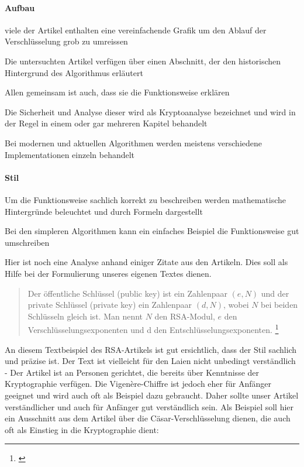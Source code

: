 \documentclass[11pt,paper=a4,final]{scrartcl}
\begin{document}
\paragraph{Aufbau}
\begin{itemize*}
  \item viele der Artikel enthalten eine vereinfachende Grafik um den Ablauf der
  Verschl\"usselung grob zu umreissen
  \item Die untersuchten Artikel verf\"ugen \"uber einen Abschnitt, der den
  historischen Hintergrund des Algorithmus erl\"autert
  \item Allen gemeinsam ist auch, dass sie die Funktionsweise erkl\"aren
  \item Die Sicherheit und Analyse dieser wird als Kryptoanalyse bezeichnet und
  wird in der Regel in einem oder gar mehreren Kapitel behandelt
  \item Bei modernen und aktuellen Algorithmen werden meistens verschiedene
  Implementationen einzeln behandelt
\end{itemize*}
\paragraph{Stil}
\begin{itemize*}
  \item Um die Funktionsweise sachlich korrekt zu beschreiben werden
  mathematische Hintergr\"unde beleuchtet und durch Formeln dargestellt
  \item Bei den simpleren Algorithmen kann ein einfaches Beispiel die
  Funktionsweise gut umschreiben
\end{itemize*}

Hier ist noch eine Analyse anhand einiger Zitate aus den Artikeln. Dies soll als
Hilfe bei der Formulierung unseres eigenen Textes dienen.

\begin{quote}
  \frqq Der öffentliche Schlüssel (public key) ist ein Zahlenpaar \((e,N)\) und
  der private Schlüssel (private key) ein Zahlenpaar \((d,N)\), wobei \(N\) bei
  beiden Schlüsseln gleich ist. Man nennt \(N\) den RSA-Modul, \(e\) den
  Verschlüsselungsexponenten und d den Entschlüsselungsexponenten.\flqq
  \footnote{\cite{wiki:Caesar-Verschluesselung}}
\end{quote}

An diesem Textbeispiel des RSA-Artikels ist gut ersichtlich, dass der Stil
sachlich und pr\"azise ist. Der Text ist vielleicht f\"ur den Laien nicht
unbedingt verst\"andlich - Der Artikel ist an Personen gerichtet, die bereits
\"uber Kenntnisse der Kryptographie verf\"ugen. Die Vigen\`ere-Chiffre ist
jedoch eher f\"ur Anf\"anger geeignet und wird auch oft als Beispiel dazu
gebraucht. Daher sollte unser Artikel verst\"andlicher und auch f\"ur Anf\"anger
gut verst\"andlich sein. Als Beispiel soll hier ein Ausschnitt aus dem Artikel
\"uber die C\"asar-Verschl\"usselung dienen, die auch oft als Einstieg in die
Kryptographie dient:
\end{document}
